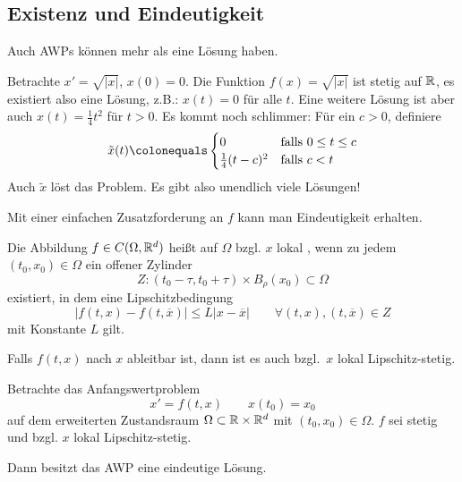 \subsection{Existenz und Eindeutigkeit}

Auch AWPs können mehr als eine Lösung haben.

\begin{bsp}
	Betrachte $x' =\sqrt{\vert x \vert}$, $x(0)=0$. 
	Die Funktion $f(x)=\sqrt{\vert x \vert}$ ist stetig auf $\mathbb R$, es existiert also eine Lösung, z.B.: $x(t)=0$ für alle $t$. Eine weitere Lösung ist aber auch $x(t)=\frac{1}{4} t^2$ für $t>0$. Es kommt noch schlimmer:
	Für ein $c>0$, definiere
	\begin{equation*}
	\tilde{x}(t)\colonequals
	\begin{cases}
	0 & \text{falls}\ 0 \leq t \leq c \\
	\frac{1}{4} (t-c)^2 & \text{falls}\ c<t
	\end{cases}
	\end{equation*}
	Auch $\tilde{x}$ löst das Problem. Es gibt also unendlich viele Lösungen!
\end{bsp}


Mit einer einfachen Zusatzforderung an $f$ kann man Eindeutigkeit erhalten.

\begin{defi}
	Die Abbildung $f \in C(\Omega,\mathbb R^d)$ heißt auf $\Omega$ bzgl. $x$ lokal , wenn zu jedem $(t_0,x_0 ) \in \Omega$ ein offener Zylinder 
	\begin{equation*}
		Z \colon (t_0-\tau,t_0+\tau ) \times B_{\rho} (x_0 ) \subset \Omega
	\end{equation*}
	existiert, in dem eine Lipschitzbedingung
	\begin{equation*}
		\vert f(t,x)-f (t,\overline{x} ) \vert \leq L \vert x-\overline{x} \vert
		\qquad
		\forall (t,x),(t,\overline{x} ) \in Z
	\end{equation*}
	mit Konstante $L$ gilt.
\end{defi}

\begin{bem}
	Falls $f(t,x)$ nach $x$ ableitbar ist, dann ist es auch bzgl.\ $x$ lokal Lipschitz-stetig.
\end{bem}

\begin{satz}
	Betrachte das Anfangswertproblem
	\begin{equation*}
		x' = f(t,x) \qquad x(t_0) = x_0
	\end{equation*}
	auf dem erweiterten Zustandsraum $\Omega \subset \mathbb R \times \mathbb R^d$ mit $(t_0, x_0) \in \Omega$.
	$f$ sei stetig und bzgl. $x$ lokal Lipschitz-stetig.
	
	Dann besitzt das AWP eine eindeutige Lösung.
\end{satz}


